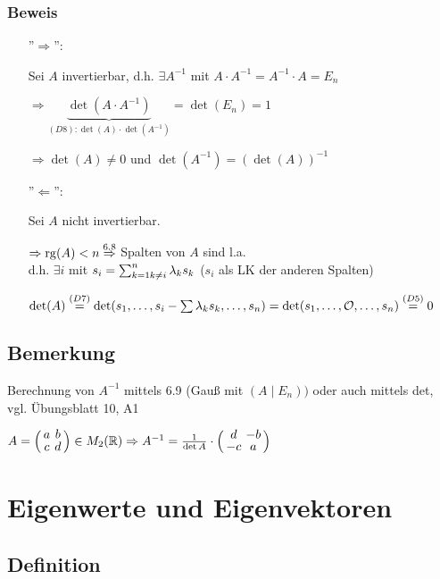 \subsubsection*{Beweis} 
\begin{itemize}
	\item[''$\Rightarrow$'':]
	
	Sei $A$ invertierbar, d.h. $\exists A^{-1}$ mit $A\cdot A^{-1} = A^{-1}\cdot A = E_n$
	
	$\Rightarrow \underbrace{\det(A\cdot A^{-1})}_{(D8): \det(A) \cdot \det(A^{-1})} = \det(E_n) = 1$
	
	 $\Rightarrow \det(A) \neq 0$ und $\det(A^{-1}) = (\det(A))^{-1}$
	 
	 \item[''$\Leftarrow$'':]
	 
	 Sei $A$ nicht invertierbar.
	 
	 $\Rightarrow \mathrm{ rg }(A) < n
	 \\ \stackrel{6.8}{\Rightarrow}$ Spalten von $A$ sind l.a. %
	 \\ d.h. $\exists i$ mit $s_i = \sum_{k=1\\k\neq i}^{n}\lambda_k s_k$ ($s_i$ als LK der anderen Spalten)
	 
	 $\det(A) \stackrel{(D7)}{=} \det(s_1, \dots, s_i- \sum\lambda_ks_k, \dots, s_n)
	 \\ = \det(s_1, \dots, \mathcal{O}, \dots, s_n) 
	 \stackrel{(D5)}{=} 0$
	
	
\end{itemize} 

\subsection{Bemerkung}

Berechnung von $A^{-1}$ mittels 6.9 (Gauß mit $(A\;|\;E_n))$ oder auch mittels det, vgl. Übungsblatt 10, A1

$A = \aMatrix{cc}{a & b \\ c & d} \in M_2(\R) \Rightarrow A^{-1} = \frac{1}{\det A} \cdot \aMatrix{cc}{d & - b \\ - c & a}$



\section{Eigenwerte und Eigenvektoren}

\subsection[Definition (Eigenwert)]{Definition}

